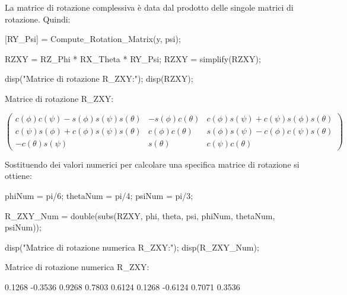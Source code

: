 \documentclass[11pt, a4paper]{article}
\begin{document}
\begin{par}
\begin{flushleft}
La matrice di rotazione complessiva è data dal prodotto delle singole matrici di rotazione. Quindi:
\end{flushleft}
\end{par}

\begin{matlabcode}

[RY_Psi] = Compute_Rotation_Matrix(y, psi);

RZXY = RZ_Phi * RX_Theta * RY_Psi;
RZXY = simplify(RZXY);

disp("Matrice di rotazione R_ZXY:");
disp(RZXY);
\end{matlabcode}
\begin{matlaboutput}
Matrice di rotazione R_ZXY:
\end{matlaboutput}
\[
    \begin{pmatrix}
        c(\phi)c(\psi) - s(\phi)s(\psi)s(\theta) & -s(\phi)c(\theta) & c(\phi)s(\psi) + c(\psi)s(\phi)s(\theta) \\
        c(\psi)s(\phi) + c(\phi)s(\psi)s(\theta) & c(\phi)c(\theta) & s(\phi)s(\psi) - c(\phi)c(\psi)s(\theta) \\
        -c(\theta)s(\psi) & s(\theta) & c(\psi)c(\theta)
    \end{pmatrix}
\]

\begin{par}
\begin{flushleft}
Sostituendo dei valori numerici per calcolare una specifica matrice di rotazione si ottiene:
\end{flushleft}
\end{par}

\begin{matlabcode}
phiNum = pi/6;   %
thetaNum = pi/4; %
psiNum = pi/3;   %

R_ZXY_Num = double(subs(RZXY, {phi, theta, psi}, {phiNum, thetaNum, psiNum}));

disp("Matrice di rotazione numerica R_ZXY:");
disp(R_ZXY_Num);
\end{matlabcode}
\begin{matlaboutput}
Matrice di rotazione numerica R_ZXY:
\end{matlaboutput}
\begin{matlaboutput}
    0.1268   -0.3536    0.9268
    0.7803    0.6124    0.1268
   -0.6124    0.7071    0.3536
\end{matlaboutput}
\end{document}
